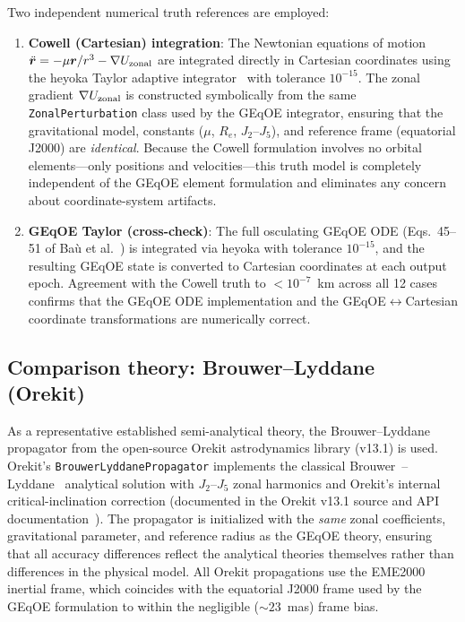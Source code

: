 \documentclass[11pt]{article}
\begin{document}
Two independent numerical truth references are employed:
\begin{enumerate}
\item \textbf{Cowell (Cartesian) integration}: The Newtonian equations of
motion $\ddot{\bm{r}} = -\mu\bm{r}/r^3 - \nabla U_{\rm zonal}$ are
integrated directly in Cartesian coordinates using the heyoka Taylor adaptive
integrator~\cite{biscani2021} with tolerance $10^{-15}$. The zonal gradient
$\nabla U_{\rm zonal}$ is constructed symbolically from the same
\texttt{ZonalPerturbation} class used by the GEqOE integrator, ensuring that
the gravitational model, constants ($\mu$, $R_e$, $J_2$--$J_5$), and
reference frame (equatorial J2000) are \emph{identical}. Because the Cowell
formulation involves no orbital elements---only positions and
velocities---this truth model is completely independent of the GEqOE element
formulation and eliminates any concern about coordinate-system artifacts.
\item \textbf{GEqOE Taylor (cross-check)}: The full osculating GEqOE ODE
(Eqs.~45--51 of Ba\`u et al.~\cite{bau2021}) is integrated via heyoka with
tolerance $10^{-15}$, and the resulting GEqOE state is converted to Cartesian
coordinates at each output epoch. Agreement with the Cowell truth to
$< 10^{-7}$~km across all 12 cases confirms that the GEqOE ODE
implementation and the GEqOE$\leftrightarrow$Cartesian coordinate
transformations are numerically correct.
\end{enumerate}

\subsection{Comparison theory: Brouwer--Lyddane (Orekit)}

As a representative established semi-analytical theory, the Brouwer--Lyddane
propagator from the open-source Orekit astrodynamics library (v13.1) is used.
Orekit's \texttt{BrouwerLyddanePropagator} implements the classical
Brouwer~\cite{brouwer1959}--Lyddane~\cite{lyddane1963} analytical solution
with $J_2$--$J_5$ zonal harmonics and Orekit's internal
critical-inclination correction (documented in the Orekit v13.1 source
and API documentation~\cite{orekit}). The propagator is initialized with the
\emph{same} zonal coefficients, gravitational parameter, and reference radius
as the GEqOE theory, ensuring that all accuracy differences reflect the
analytical theories themselves rather than differences in the physical model.
All Orekit propagations use the EME2000 inertial frame, which coincides with
the equatorial J2000 frame used by the GEqOE formulation to within the
negligible ($\sim\!23$~mas) frame bias.
\end{document}
